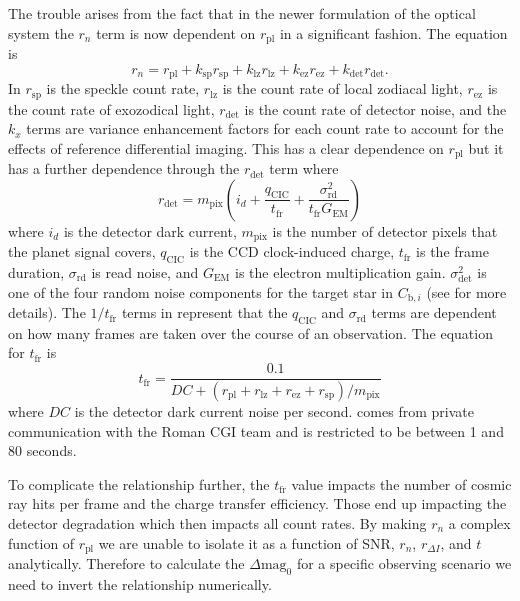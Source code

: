 The trouble arises from the fact that in the newer formulation of the optical
system the $r_n$ term is now dependent on $r_\textrm{pl}$ in a significant
fashion. The equation is
\begin{equation}
  r_n = r_\textrm{pl} + k_\textrm{sp} r_\textrm{sp} + k_\textrm{lz}
  r_\textrm{lz}+ k_\textrm{ez} r_\textrm{ez}+ k_\textrm{det} r_\textrm{det}.
  \label{eq:rn}
\end{equation}
In  $r_\textrm{sp}$ is the speckle count rate, $r_\textrm{lz}$ is the count
rate of local zodiacal light, $r_\textrm{ez}$ is the count rate of
exozodical light, $r_\textrm{det}$ is the count rate of detector noise, and the
$k_x$ terms are variance enhancement factors for each count rate to account for
the effects of reference differential imaging. This has a clear dependence on
$r_\textrm{pl}$ but it has a further dependence through the $r_\textrm{det}$ term
where
\begin{equation}
  r_\textrm{det} =  m_\textrm{pix}\left( i_d +
  \frac{q_\textrm{CIC}}{t_\textrm{fr}} +
\frac{\sigma^2_\textrm{rd}}{t_\textrm{fr} G_\textrm{EM}} \right)
  \label{eq:rdet}
\end{equation}
where $i_d$ is the detector dark current, $m_{\textrm{pix}}$ is the number of
detector pixels that the planet signal covers, $q_{\textrm{CIC}}$ is the CCD
clock-induced charge, $t_{\textrm{fr}}$ is the frame duration,
$\sigma_{\textrm{rd}}$ is read noise, and $G_{\textrm{EM}}$ is the electron
multiplication gain. $\sigma_{\textrm{det}}^2$ is one of the four random noise
components for the target star in $C_{\textrm{b},i}$ (see \citet{Nemati2020a}
for more details). The $1/t_{\textrm{fr}}$ terms in
 represent that the $q_\textrm{CIC}$
and $\sigma_\textrm{rd}$ terms are dependent on how many frames are taken over
the course of an observation. The equation for $t_\textrm{fr}$ is 
\begin{equation}
  t_{\textrm{fr}} = \frac{0.1}{DC +\left(r_{\textrm{pl}}+r_{\textrm{lz}}+r_{\textrm{ez}}+r_{\textrm{sp}}\right)/m_{\textrm{pix}}}
  \label{eq:bijan_frame_duration}
\end{equation}
where $DC$ is the detector dark current noise per second.
 comes from private communication with the Roman
CGI team and is restricted to be between 1 and 80 seconds.

To complicate the relationship further, the $t_{\textrm{fr}}$ value impacts the
number of cosmic ray hits per frame and the charge transfer efficiency. Those
end up impacting the detector degradation which then impacts all count
rates. 
By making $r_n$ a complex function of $r_\textrm{pl}$ we are unable to isolate
it as a function of SNR, $r_n$, $r_{\Delta I}$, and $t$ analytically. Therefore
to calculate the $\Delta\textrm{mag}_0$ for a specific observing scenario we
need to invert the relationship numerically.

